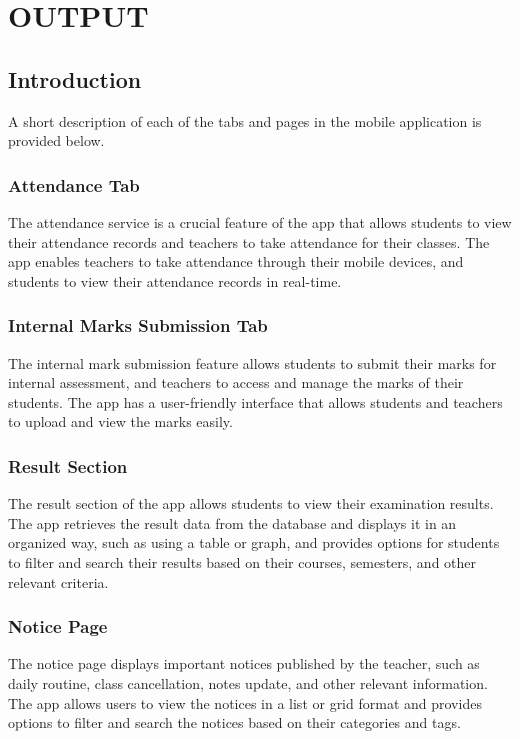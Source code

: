 \chapter{OUTPUT}

\section{Introduction}
A short description of each of the tabs and pages in the mobile application is provided below.

\subsection{Attendance Tab}
The attendance service is a crucial feature of the app that allows students to view their attendance records and teachers to take attendance for their classes. The app enables teachers to take attendance through their mobile devices, and students to view their attendance records in real-time.

\subsection{Internal Marks Submission Tab}
The internal mark submission feature allows students to submit their marks for internal assessment, and teachers to access and manage the marks of their students. The app has a user-friendly interface that allows students and teachers to upload and view the marks easily.

\subsection{Result Section}
The result section of the app allows students to view their examination results. The app retrieves the result data from the database and displays it in an organized way, such as using a table or graph, and provides options for students to filter and search their results based on their courses, semesters, and other relevant criteria.

\subsection{Notice Page}
The notice page displays important notices published by the teacher, such as daily routine, class cancellation, notes update, and other relevant information. The app allows users to view the notices in a list or grid format and provides options to filter and search the notices based on their categories and tags.

